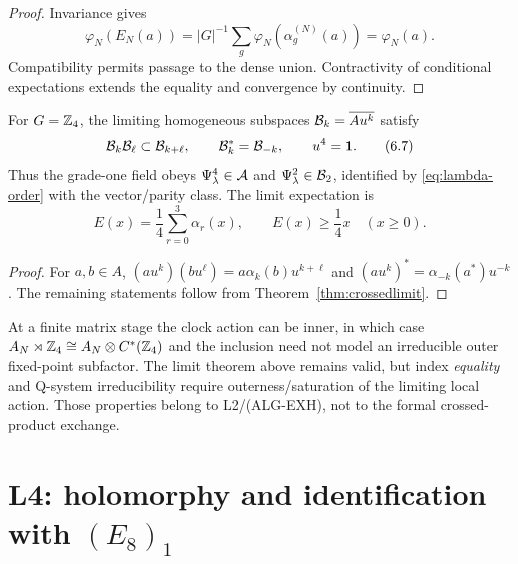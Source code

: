 \begin{proof}
Invariance gives
\[
 \varphi_N(E_N(a))
 =|G|^{-1}\sum_g\varphi_N(\alpha_g^{(N)}(a))
 =\varphi_N(a).
\]
Compatibility permits passage to the dense union.  Contractivity of
conditional expectations extends the equality and convergence by
continuity.
\end{proof}

\begin{corollary}\label{cor:Z4}
For $G=\mathbb Z_4$, the limiting homogeneous subspaces
$\mathcal B_k=\overline{Au^k}$ satisfy
\[
 \mathcal B_k\mathcal B_\ell\subset\mathcal B_{k+\ell},\qquad
 \mathcal B_k^*=\mathcal B_{-k},\qquad u^4=\mathbf 1.
\tag{6.7}\label{eq:grades}
\]
Thus the grade-one field obeys
$\Psi_\lambda^4\in\mathcal A$ and
$\Psi_\lambda^2\in\mathcal B_2$, identified by
\eqref{eq:lambda-order} with the vector/parity class.  The limit
expectation is
\[
 E(x)=\frac14\sum_{r=0}^3\alpha_r(x),\qquad E(x)\ge\frac14x
\quad(x\ge0).
\tag{6.8}\label{eq:quarterE}
\]
\end{corollary}

\begin{proof}
For $a,b\in A$,
$(au^k)(bu^\ell)=a\alpha_k(b)u^{k+\ell}$ and
$(au^k)^*=\alpha_{-k}(a^*)u^{-k}$.  The remaining statements follow from
Theorem~\ref{thm:crossedlimit}.
\end{proof}

\begin{remark}
At a finite matrix stage the clock action can be inner, in which case
$A_N\rtimes\mathbb Z_4\cong A_N\otimes C^*(\mathbb Z_4)$ and the inclusion need not
model an irreducible outer fixed-point subfactor.  The limit theorem
above remains valid, but index \emph{equality} and Q-system
irreducibility require outerness/saturation of the limiting local action.
Those properties belong to L2/\textup{(ALG-EXH)}, not to the formal
crossed-product exchange.
\end{remark}

\section{L4: holomorphy and identification with \texorpdfstring{$(E_8)_1$}{E8 level 1}}
\label{sec:L4}

